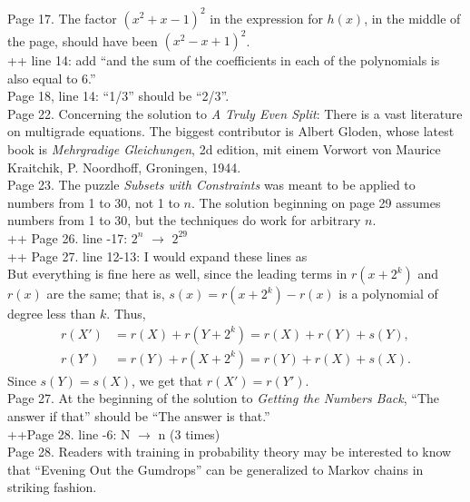 \documentclass[11pt]{article}
\begin{document}
Page 17. The factor $(x^2+x-1)^2$ in the expression for $h(x)$, in the middle
of the page, should have been $(x^2-x+1)^2$.\\

++ line 14: add ``and the sum of the coefficients in each of the polynomials is also equal to 6.''\\

Page 18, line 14: ``1/3'' should be ``2/3''.\\

Page 22. Concerning the solution to {\em A Truly Even Split}:
There is a vast literature on multigrade equations.
The biggest contributor is Albert Gloden, whose latest book
is {\em Mehrgradige Gleichungen}, 2d edition, mit einem Vorwort von Maurice Kraitchik,
P. Noordhoff, Groningen, 1944.\\

Page 23.  The puzzle {\em Subsets with Constraints}
was meant to be applied to numbers from 1 to 30,
not 1 to $n$.  The solution beginning on page 29 assumes
numbers from 1 to 30, but the techniques do work for arbitrary $n$.\\

++ Page 26. line -17: $2^n$ $\to$ $2^{29}$\\

++ Page 27. line 12-13: I would expand these lines as \\

But everything is fine here as well, since the leading terms in \( r(x+2^k) \) and \( r(x) \) are the same;
that is, \( s(x) = r(x+2^k) - r(x) \) is a polynomial of degree less than \( k \).
Thus,
\begin{align*}
r(X') &= r(X) + r(Y + 2^k) = r(X) + r(Y) + s(Y), \\
r(Y') &= r(Y) + r(X + 2^k) = r(Y) + r(X) + s(X).
\end{align*}
Since \( s(Y) = s(X) \), we get that \( r(X') = r(Y') \).
\\

Page 27. At the beginning of the solution to {\em Getting the Numbers Back},
``The answer if that'' should be ``The answer is that.''\\

++Page 28. line -6: N $\to$ n (3 times) \\

Page 28.  Readers with training in probability theory may be interested to know that
``Evening Out the Gumdrops'' can be generalized to Markov chains in striking fashion.
\end{document}
